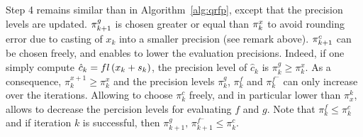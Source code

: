 \documentclass{article}[12pt]
\begin{document}
	Step 4 remains similar than in Algorithm~\ref{alg:qrfp}, except that the precision levels are updated. $\pi_{k+1}^g$ is chosen greater or equal than $\pi_{k}^x$ to avoid rounding error due to casting of $x_k$ into a smaller precision (see remark above). $\pi_{k+1}^c$ can be chosen freely, and enables to lower the evaluation precisions. Indeed, if one simply compute $\hat{c}_k = fl\left(x_k+s_k\right)$, the precision level of $\hat{c}_k$ is $\pi_k^g \geq \pi_k^x$. As a consequence, $\pi_k^{x+1} \geq \pi_k^x$ and the precision levels $\pi_k^g$, $\pi_k^f$ and $\pi_k^{f^-}$ can only increase over the iterations. Allowing to choose $\pi_k^c$ freely, and in particular lower than $\pi_x^k$, allows to decrease the percision levels for evaluating $f$ and $g$. Note that $\pi_k^f \leq \pi_k^c$ and if iteration $k$ is successful, then $ \pi_{k+1}^g,\,\pi_{k+1}^{f^-} \leq \pi_k^c$. 
	
\end{document}
